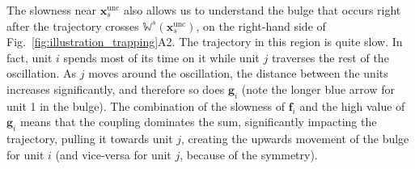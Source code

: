 The slowness near $\mathbf{x}_s^\mathrm{unc}$ also allows us to understand the bulge that occurs right after the trajectory crosses $\mathbb{W}^s(\mathbf{x}_s^\mathrm{unc})$, on the right-hand side of Fig.~\ref{fig:illustration_trapping}A2. The trajectory in this region is quite slow. In fact, unit $i$ spends most of its time on it while unit $j$ traverses the rest of the oscillation. As $j$ moves around the oscillation, the distance between the units increases significantly, and therefore so does $\mathbf{g}_i$ (note the longer blue arrow for unit 1 in the bulge). The combination of the slowness of $\mathbf{f}_i$ and the high value of $\mathbf{g}_i$ means that the coupling dominates the sum, significantly impacting the trajectory, pulling it towards unit $j$, creating the upwards movement of the bulge for unit $i$ (and vice-versa for unit $j$, because of the symmetry). 
%

